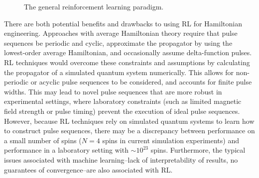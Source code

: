 \documentclass{article}
\begin{document}
\begin{figure}[ht]
    \centering
    \caption{The general reinforcement learning paradigm.}
    \label{fig:RL}
\end{figure}

There are both potential benefits and drawbacks to using RL for Hamiltonian engineering. Approaches with average Hamiltonian theory require that pulse sequences be periodic and cyclic, approximate the propagator by using the lowest-order average Hamiltonian, and occasionally assume delta-function pulses. RL techniques would overcome these constraints and assumptions by calculating the propagator of a simulated quantum system numerically. This allows for non-periodic or acyclic pulse sequences to be considered, and accounts for finite pulse widths.
This may lead to novel pulse sequences that are more robust in experimental settings, where laboratory constraints (such as limited magnetic field strength or pulse timing) prevent the execution of ideal pulse sequences.
However, because RL techniques rely on simulated quantum systems to learn how to construct pulse sequences, there may be a discrepancy between performance on a small number of spins ($N=4$ spins in current simulation experiments) and performance in a laboratory setting with $\sim10^{23}$ spins. Furthermore, the typical issues associated with machine learning--lack of interpretability of results, no guarantees of convergence--are also associated with RL.
\end{document}
